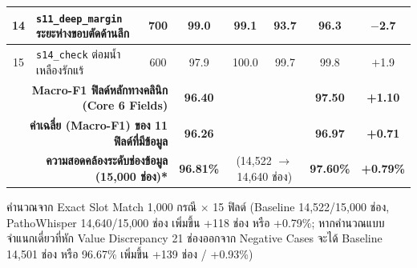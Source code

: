 \begin{table}[H]
\begin{tabular}{|c|p{4.6cm}|c|c|c|c|c|c|}
\hline
14 & \texttt{s11\_deep\_margin} ระยะห่างขอบตัดด้านลึก & 700 & 99.0 & 99.1 & 93.7 & 96.3 & $-$2.7 \\
\hline
15 & \texttt{s14\_check} ต่อมน้ำเหลืองรักแร้ & 600 & 97.9 & 100.0 & 99.7 & 99.8 & $+$1.9 \\
\hline
\hline
\multicolumn{3}{|r|}{\textbf{Macro-F1 ฟิลด์หลักทางคลินิก (Core 6 Fields)}} & \textbf{96.40} & \multicolumn{2}{c|}{} & \textbf{97.50} & \textbf{+1.10} \\
\hline
\multicolumn{3}{|r|}{\textbf{ค่าเฉลี่ย (Macro-F1) ของ 11 ฟิลด์ที่มีข้อมูล}} & \textbf{96.26} & \multicolumn{2}{c|}{} & \textbf{96.97} & \textbf{+0.71} \\
\hline
\multicolumn{3}{|r|}{\textbf{ความสอดคล้องระดับช่องข้อมูล (15,000 ช่อง)*}} & \textbf{96.81\%} & \multicolumn{2}{c|}{(14,522 $\rightarrow$ 14,640 ช่อง)} & \textbf{97.60\%} & \textbf{+0.79\%} \\
\hline
\end{tabular}
\par\vspace{2pt}\footnotesize\noindent *คำนวณจาก Exact Slot Match 1,000 กรณี $\times$ 15 ฟิลด์ (Baseline 14,522/15,000 ช่อง, PathoWhisper 14,640/15,000 ช่อง เพิ่มขึ้น +118 ช่อง หรือ +0.79\%; หากคำนวณแบบจำแนกเดี่ยวที่หัก Value Discrepancy 21 ช่องออกจาก Negative Cases จะได้ Baseline 14,501 ช่อง หรือ 96.67\% เพิ่มขึ้น +139 ช่อง / +0.93\%)
\end{table}
